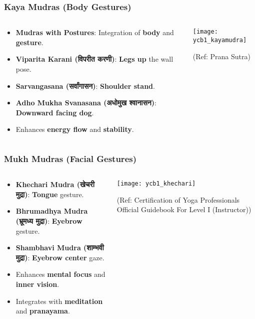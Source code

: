 \begin{frame}[fragile]\frametitle{Kaya Mudras (Body Gestures)}
\begin{columns}
    \begin{column}[T]{0.5\linewidth}
      \begin{itemize}
        \item \textbf{Mudras with Postures}: Integration of \textbf{body} and \textbf{gesture}.
        \item \textbf{Viparita Karani (विपरीत करणी)}: \textbf{Legs up} the wall pose.
        \item \textbf{Sarvangasana (सर्वांगासन)}: \textbf{Shoulder stand}.
        \item \textbf{Adho Mukha Svanasana (अधोमुख श्वानासन)}: \textbf{Downward facing dog}.
        \item Enhances \textbf{energy flow} and \textbf{stability}.
      \end{itemize}
    \end{column}
    \begin{column}[T]{0.5\linewidth}
        \begin{center}
        \texttt{[image: ycb1\_kayamudra]}
				
		{\tiny (Ref: Prana Sutra)}	 
        \end{center}	
    \end{column}
\end{columns}
\end{frame}


\begin{frame}[fragile]\frametitle{Mukh Mudras (Facial Gestures)}
\begin{columns}
    \begin{column}[T]{0.5\linewidth}
      \begin{itemize}
        \item \textbf{Khechari Mudra (खेचरी मुद्रा)}: \textbf{Tongue} gesture.
        \item \textbf{Bhrumadhya Mudra (भ्रूमध्य मुद्रा)}: \textbf{Eyebrow} gesture.
        \item \textbf{Shambhavi Mudra (शाम्भवी  मुद्रा)}: \textbf{Eyebrow center} gaze.
        \item Enhances \textbf{mental focus} and \textbf{inner vision}.
        \item Integrates with \textbf{meditation} and \textbf{pranayama}.
      \end{itemize}
    \end{column}
    \begin{column}[T]{0.5\linewidth}
        \begin{center}
        \texttt{[image: ycb1\_khechari]}
				
		{\tiny (Ref: Certification of Yoga Professionals Official Guidebook For Level I (Instructor))}	 
        \end{center}	
    \end{column}
\end{columns}
\end{frame}



